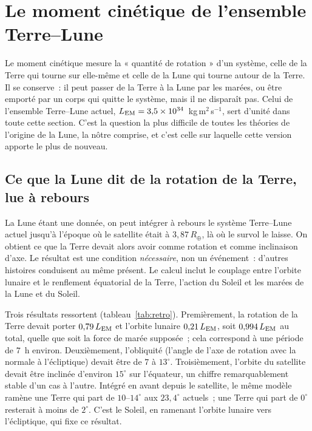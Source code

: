 \documentclass[11pt,a4paper]{article}
\newcommand{\Rt}{\ensuremath{R_\oplus}}
\newcommand{\LEM}{\ensuremath{L_{\rm EM}}}
\begin{document}
\section{Le moment cinétique de l'ensemble Terre--Lune}
\label{sec:AM}

Le moment cinétique mesure la « quantité de rotation » d'un système, celle de la Terre qui tourne sur elle-même et celle de la Lune qui tourne autour de la Terre. Il se conserve~: il peut passer de la Terre à la Lune par les marées, ou être emporté par un corps qui quitte le système, mais il ne disparaît pas. Celui de l'ensemble Terre--Lune actuel, $\LEM=3{,}5\times10^{34}$~kg\,m$^2$\,s$^{-1}$, sert d'unité dans toute cette section. C'est la question la plus difficile de toutes les théories de l'origine de la Lune, la nôtre comprise, et c'est celle sur laquelle cette version apporte le plus de nouveau.

\subsection{Ce que la Lune dit de la rotation de la Terre, lue à rebours}
\label{sec:obl}

La Lune étant une donnée, on peut intégrer à rebours le système Terre--Lune actuel jusqu'à l'époque où le satellite était à $3{,}87\,\Rt$, là où le survol le laisse. On obtient ce que la Terre devait alors avoir comme rotation et comme inclinaison d'axe. Le résultat est une condition \emph{nécessaire}, non un événement~: d'autres histoires conduisent au même présent. Le calcul inclut le couplage entre l'orbite lunaire et le renflement équatorial de la Terre, l'action du Soleil et les marées de la Lune et du Soleil.

Trois résultats ressortent (tableau~\ref{tab:retro}). Premièrement, la rotation de la Terre devait porter $0{,}79\,\LEM$ et l'orbite lunaire $0{,}21\,\LEM$, soit $0{,}994\,\LEM$ au total, quelle que soit la force de marée supposée~; cela correspond à une période de $7$~h environ. Deuxièmement, l'obliquité (l'angle de l'axe de rotation avec la normale à l'écliptique) devait être de $7$ à $13^\circ$. Troisièmement, l'orbite du satellite devait être inclinée d'environ $15^\circ$ sur l'équateur, un chiffre remarquablement stable d'un cas à l'autre. Intégré en avant depuis le satellite, le même modèle ramène une Terre qui part de $10$--$14^\circ$ aux $23{,}4^\circ$ actuels~; une Terre qui part de $0^\circ$ resterait à moins de $2^\circ$. C'est le Soleil, en ramenant l'orbite lunaire vers l'écliptique, qui fixe ce résultat.
\end{document}
